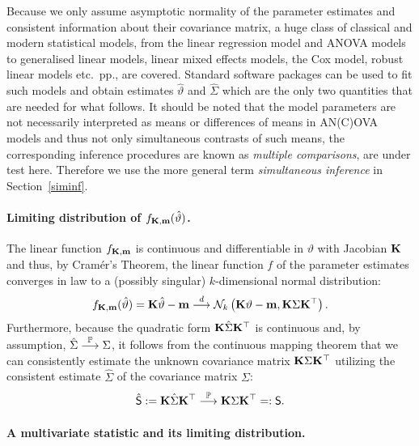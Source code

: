 \documentclass[12pt]{article}
\begin{document}
Because we only assume asymptotic normality of the parameter estimates
and consistent information about their covariance matrix,
a huge class of classical and modern statistical models, from the linear
regression model and ANOVA models to generalised linear models, linear mixed
effects models, the Cox model, robust linear models etc.~pp., are 
covered. Standard software packages can be used to fit such models
and obtain estimates $\hat{\vartheta}$ and $\hat{\Sigma}$ which
are the only two quantities that are needed for what follows.
It should be noted that the model parameters are not necessarily
interpreted as means or differences of means in AN(C)OVA models
and thus not only simultaneous contrasts of such means, the corresponding
inference procedures are known as \emph{multiple comparisons}, 
are under test here. Therefore we use the more general term
\emph{simultaneous inference} in Section~\ref{siminf}.


\paragraph{Limiting distribution of $f_{\mathbf{K},\mathbf{m}}(\hat{\vartheta})$.}

The linear function $f_{\mathbf{K}, \mathbf{m}}$ is continuous and differentiable in
$\vartheta$ with Jacobian $\mathbf{K}$ and thus, by Cram{\'e}r's Theorem, 
the linear function $f$ of the parameter estimates
converges in law to a (possibly singular) $k$-dimensional normal distribution:
\begin{eqnarray} \label{dist_f}
f_{\mathbf{K}, \mathbf{m}}(\hat{\vartheta}) = \mathbf{K} \hat{\vartheta} - \mathbf{m} 
\stackrel{d}{\longrightarrow} \mathcal{N}_k\left(\mathbf{K} \vartheta - \mathbf{m}, \mathbf{K} \Sigma \mathbf{K}^\top\right).
\end{eqnarray}
Furthermore, because the quadratic form $\mathbf{K} \hat{\Sigma} \mathbf{K}^\top$
is continuous and, by assumption, $\hat{\Sigma} \stackrel{\mathbb{P}}{\longrightarrow} \Sigma$, 
it follows from the continuous mapping theorem that we can 
consistently estimate the unknown covariance matrix $\mathbf{K} \Sigma \mathbf{K}^\top$ utilizing
the consistent estimate $\hat{\Sigma}$ of the covariance matrix $\Sigma$:
\begin{eqnarray*}
\hat{\textsf{S}} := \mathbf{K} \hat{\Sigma} \mathbf{K}^\top \stackrel{\mathbb{P}}{\longrightarrow} \mathbf{K} \Sigma \mathbf{K}^\top =: \textsf{S}.
\end{eqnarray*}

\paragraph{A multivariate statistic and its limiting distribution.}
\end{document}
